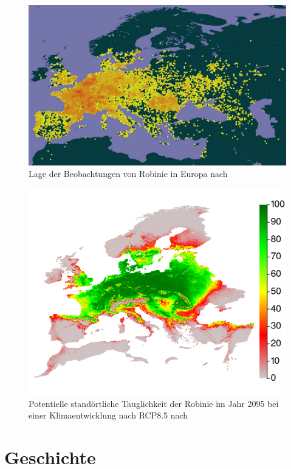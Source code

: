 \documentclass[twocolumn]{scrartcl}
\begin{document}
\begin{figure}[htbp]
  \centering
  \includegraphics[width=.9\linewidth]{./bild/verbreitungRobEur}
  \caption{Lage der Beobachtungen von Robinie in Europa nach \citet{gbifRob}}
  \label{fig:verbreitungEur}
\end{figure}

\begin{figure}[htbp]
  \centering
  \includegraphics[width=.9\linewidth]{./bild/potentialEuropaZukunft85}
  \caption{Potentielle standörtliche Tauglichkeit der Robinie im Jahr 2095 bei einer Klimaentwicklung nach RCP8.5 nach \citet{mauri2022baumartenZukunft}}
  \label{fig:verbreitungEuPotZukunft}
\end{figure}

\section{Geschichte}
\end{document}
